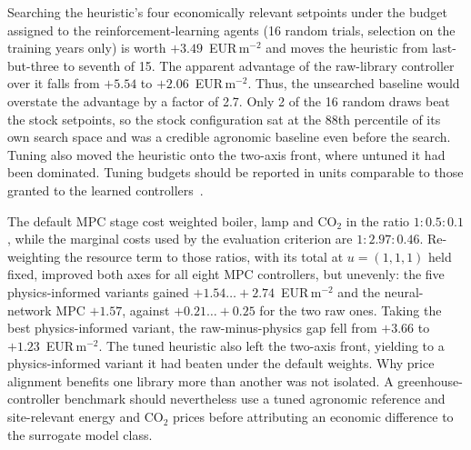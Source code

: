 Searching the heuristic's four economically relevant setpoints under the budget assigned
to the reinforcement-learning agents (16 random trials, selection on the training years only) is worth
$+3.49$~EUR\,m$^{-2}$ and moves the heuristic from last-but-three to seventh of
15. The apparent advantage of the raw-library controller over it falls
from $+5.54$ to $+2.06$~EUR\,m$^{-2}$. Thus, the unsearched baseline would overstate the
advantage by a factor of 2.7.
Only 2 of the 16 random draws beat the stock setpoints, so the stock configuration sat
at the 88th percentile of its own search space and was a credible agronomic baseline
even before the search. Tuning also moved the heuristic onto the
two-axis front, where untuned it had been dominated.
Tuning budgets should be reported in units comparable to those granted to the
learned controllers~\cite{henderson2018}.

The default MPC stage cost weighted boiler, lamp and CO$_2$ in the ratio
$1:0.5:0.1$, while the marginal costs used by the evaluation criterion are
$1:2.97:0.46$. Re-weighting the resource term to those ratios, with its total at
$u=(1,1,1)$ held fixed,
improved both axes for all eight MPC controllers, but unevenly: the five
physics-informed variants gained $+1.54\ldots+2.74$~EUR\,m$^{-2}$ and the
neural-network MPC $+1.57$, against $+0.21\ldots+0.25$ for the two raw ones.
Taking the best physics-informed variant, the raw-minus-physics gap fell from
$+3.66$ to $+1.23$~EUR\,m$^{-2}$. The tuned heuristic also left the two-axis front,
yielding to a physics-informed variant it had beaten under the default weights. Why price
alignment benefits one library more than another was not isolated. A
greenhouse-controller benchmark should nevertheless use a tuned agronomic reference and
site-relevant energy and CO$_2$ prices before attributing an economic difference to the
surrogate model class.

